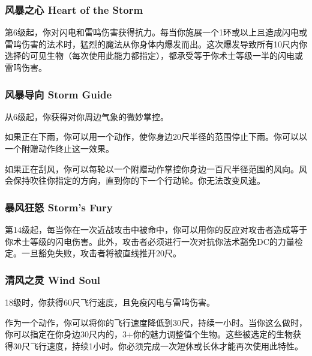 \subsubsection{风暴之心 Heart of the Storm}第6级起，你对闪电和雷鸣伤害获得抗力。每当你施展一个1环或以上且造成闪电或雷鸣伤害的法术时，猛烈的魔法从你身体内爆发而出。这次爆发导致所有10尺内你选择的可见生物（每次使用此能力都指定），都承受等于你术士等级一半的闪电或雷鸣伤害。

\subsubsection{风暴导向 Storm Guide}从6级起，你获得对你周边气象的微妙掌控。

如果正在下雨，你可以用一个动作，使你身边20尺半径的范围停止下雨。你可以以一个附赠动作终止这一效果。

如果正在刮风，你可以每轮以一个附赠动作掌控你身边一百尺半径范围的风向。风会保持吹往你指定的方向，直到你的下一个行动轮。你无法改变风速。

\subsubsection{暴风狂怒 Storm's Fury}第14级起，每当你在一次近战攻击中被命中，你可以用你的反应对攻击者造成等于你术士等级的闪电伤害。此外，攻击者必须进行一次对抗你法术豁免DC的力量检定。一旦豁免失败，攻击者将被直线推开20尺。

\subsubsection{清风之灵 Wind Soul}18级时，你获得60尺飞行速度，且免疫闪电与雷鸣伤害。

作为一个动作，你可以将你的飞行速度降低到30尺，持续一小时。当你这么做时，你可以指定在你身边30尺内的，3+你的魅力调整值个生物。这些被选定的生物获得30尺飞行速度，持续1小时。你必须完成一次短休或长休才能再次使用此特性。